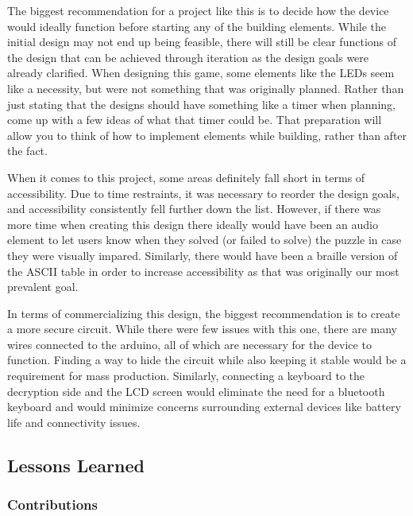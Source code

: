 \documentclass[conference]{IEEEtran}
\begin{document}
\par The biggest recommendation for a project like this is to decide how the device would ideally function before starting any of the building elements. While the initial design may not end up being feasible, there will still be clear functions of the design that can be achieved through iteration as the design goals were already clarified. When designing this game, some elements like the LEDs seem like a necessity, but were not something that was originally planned. Rather than just stating that the designs should have something like a timer when planning, come up with a few ideas of what that timer could be. That preparation will allow you to think of how to implement elements while building, rather than after the fact. 
\par When it comes to this project, some areas definitely fall short in terms of accessibility. Due to time restraints,  it was necessary to reorder the design goals, and accessibility consistently fell further down the list. However, if there was more time when creating this design there ideally would have been an audio element to let users know when they solved (or failed to solve) the puzzle in case they were visually impared. Similarly, there would have been a braille version of the ASCII table in order to increase accessibility as that was originally our most prevalent goal. 
\par In terms of commercializing this design, the biggest recommendation is to create a more secure 
circuit. While there were few issues with this one, there are many wires connected to the arduino, all of which are necessary for the device to function. Finding a way to hide the circuit while also keeping it stable would be a requirement for mass production. Similarly, connecting a keyboard to the decryption side and the LCD screen would eliminate the need for a bluetooth keyboard and would minimize concerns surrounding external devices like battery life and connectivity issues.

\subsection{Lessons Learned}

\subsubsection{Contributions}
\end{document}
